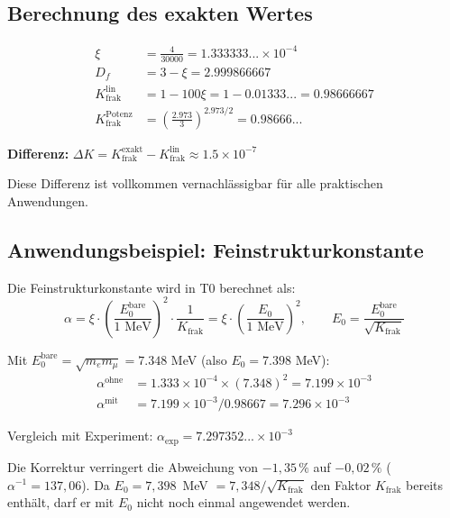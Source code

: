 	\subsection{Berechnung des exakten Wertes}
	
	\begin{align}
		\xi &= \frac{4}{30000} = 1.333333... \times 10^{-4} \\
		D_f &= 3 - \xi = 2.999866667 \\
		K_{\text{frak}}^{\text{lin}} &= 1 - 100\xi = 1 - 0.01333... = 0.98666667 \\
		K_{\text{frak}}^{\text{Potenz}} &= \left(\frac{2.973}{3}\right)^{2.973/2} = 0.98666...
	\end{align}
	
	\textbf{Differenz:} $\Delta K = K_{\text{frak}}^{\text{exakt}} - K_{\text{frak}}^{\text{lin}} \approx 1.5 \times 10^{-7}$
	
	Diese Differenz ist vollkommen vernachlässigbar für alle praktischen Anwendungen.
	
	\subsection{Anwendungsbeispiel: Feinstrukturkonstante}
	
	Die Feinstrukturkonstante wird in T0 berechnet als:
	\begin{equation}
		\alpha = \xi \cdot \left(\frac{E_0^{\text{bare}}}{1 \text{ MeV}}\right)^2 \cdot \frac{1}{K_{\text{frak}}} = \xi \cdot \left(\frac{E_0}{1 \text{ MeV}}\right)^2, \qquad E_0 = \frac{E_0^{\text{bare}}}{\sqrt{K_{\text{frak}}}}
	\end{equation}
	
	Mit $E_0^{\text{bare}} = \sqrt{m_e m_\mu} = 7.348$ MeV (also $E_0 = 7.398$ MeV):
	\begin{align}
		\alpha^{\text{ohne}} &= 1.333 \times 10^{-4} \times (7.348)^2 = 7.199 \times 10^{-3} \\
		\alpha^{\text{mit}} &= 7.199 \times 10^{-3} / 0.98667 = 7.296 \times 10^{-3}
	\end{align}
	
	Vergleich mit Experiment: $\alpha_{\text{exp}} = 7.297352... \times 10^{-3}$
	
	Die Korrektur verringert die Abweichung von $-1{,}35\,\%$ auf $-0{,}02\,\%$ ($\alpha^{-1} = 137{,}06$). Da $E_0 = 7{,}398$~MeV $= 7{,}348/\sqrt{K_{\text{frak}}}$ den Faktor $K_{\text{frak}}$ bereits enthält, darf er mit $E_0$ nicht noch einmal angewendet werden.
	
